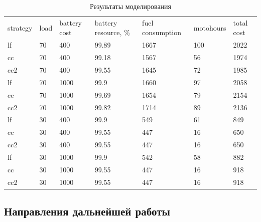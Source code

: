 \begin{table}[h]
\caption{Результаты моделирования}
\label{t:res}
\begin{tabular}{lllllll}
strategy & load & battery cost & battery resource, \% & fuel consumption & motohours & total cost \\
lf       & 70   & 400          & 99.89                & 1667             & 100       & 2022       \\
cc       & 70   & 400          & 99.18                & 1567             & 56        & 1974       \\
cc2      & 70   & 400          & 99.55                & 1645             & 72        & 1985       \\
lf       & 70   & 1000         & 99.9                 & 1660             & 97        & 2058       \\
cc       & 70   & 1000         & 99.69                & 1654             & 79        & 2154       \\
cc2      & 70   & 1000         & 99.82                & 1714             & 89        & 2136       \\
lf       & 30   & 400          & 99.9                 & 549              & 61        & 849        \\
cc       & 30   & 400          & 99.55                & 447              & 16        & 650        \\
cc2      & 30   & 400          & 99.55                & 447              & 16        & 650        \\
lf       & 30   & 1000         & 99.9                 & 542              & 58        & 882        \\
cc       & 30   & 1000         & 99.55                & 447              & 16        & 918        \\
cc2      & 30   & 1000         & 99.55                & 447              & 16        & 918       
\end{tabular}
\end{table}

\subsection{Направления дальнейшей работы}

